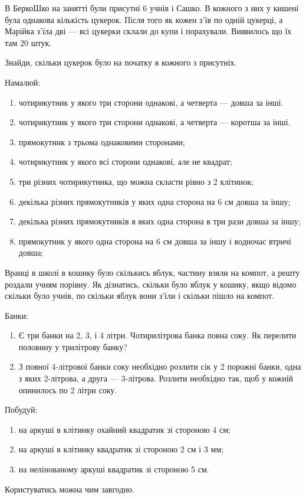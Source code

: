 \problem
В БеркоШко на занятті були присутні 6 учнів і Сашко.
В кожного з них у кишені була однакова кількість цукерок.
Після того як кожен з'їв по одній цукерці,
а Марійка з'їла дві --- всі цукерки склали до купи і порахували.
Виявилось що їх там 20 штук.

Знайди, скільки цукерок було на початку в кожного з присутніх.


\problem
Намалюй:
\begin{enumerate}
    \item чотирикутник у якого три сторони однакові,
    а четверта --- довша за інші.
    \item чотирикутник у якого три сторони однакові,
    а четверта --- коротша за інші.
    \item прямокутник з трьома однаковими сторонами;
    \item чотирикутник у якого всі сторони однакові, але не квадрат;
    \item три різних чотирикутника, що можна скласти рівно з 2 клітинок;
    \item декілька різних прямокутників у яких одна сторона
    на 6 см довша за іншу;
    \item декілька різних прямокутників я яких одна сторона
    в три рази довша за іншу;
    \item прямокутник у якого одна сторона на 6 см довша за іншу
    і водночас втричі довша;
\end{enumerate}


\problem
Вранці в школі в кошику було скількись яблук, частину взяли на компот,
а решту роздали учням порівну.
Як дізнатись, скільки було яблук у кошику, якщо відомо скільки було учнів,
по скільки яблук вони з'їли і скільки пішло на компот.


\problem
Банки:
\begin{enumerate}
    \item Є три банки на 2, 3, і 4 літри. Чотирилітрова банка повна соку.
    Як перелити половину у трилітрову банку?
    \item З повної 4-літрової банки соку необхідно розлити сік 
    у 2 порожні банки, одна з яких 2-літрова, а друга --- 3-літрова.
    Розлити необхідно так, щоб у кожній опинилось по 2 літри соку.
\end{enumerate}


\problem
Побудуй:
\begin{enumerate}
    \item на аркуші в клітинку охайний квадратик зі стороною 4 см;
    \item на аркуші в клітинку квадратик зі стороною 2 см і 3 мм;
    \item на нелінованому аркуші квадратик зі стороною 5 см.
\end{enumerate}
Користуватись можна чим завгодно.


